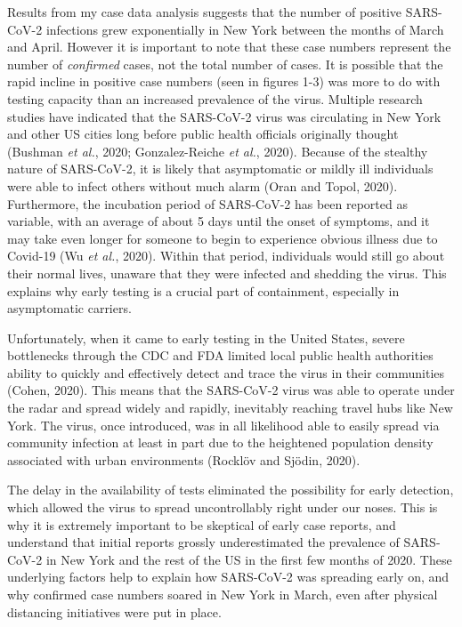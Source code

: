 \documentclass[
]{article}
\begin{document}
Results from my case data analysis suggests that the number of positive
SARS-CoV-2 infections grew exponentially in New York between the months
of March and April. However it is important to note that these case
numbers represent the number of \emph{confirmed} cases, not the total
number of cases. It is possible that the rapid incline in positive case
numbers (seen in figures 1-3) was more to do with testing capacity than
an increased prevalence of the virus. Multiple research studies have
indicated that the SARS-CoV-2 virus was circulating in New York and
other US cities long before public health officials originally thought
(Bushman \emph{et al.}, 2020; Gonzalez-Reiche \emph{et al.}, 2020).
Because of the stealthy nature of SARS-CoV-2, it is likely that
asymptomatic or mildly ill individuals were able to infect others
without much alarm (Oran and Topol, 2020). Furthermore, the incubation
period of SARS-CoV-2 has been reported as variable, with an average of
about 5 days until the onset of symptoms, and it may take even longer
for someone to begin to experience obvious illness due to Covid-19 (Wu
\emph{et al.}, 2020). Within that period, individuals would still go
about their normal lives, unaware that they were infected and shedding
the virus. This explains why early testing is a crucial part of
containment, especially in asymptomatic carriers.

Unfortunately, when it came to early testing in the United States,
severe bottlenecks through the CDC and FDA limited local public health
authorities ability to quickly and effectively detect and trace the
virus in their communities (Cohen, 2020). This means that the SARS-CoV-2
virus was able to operate under the radar and spread widely and rapidly,
inevitably reaching travel hubs like New York. The virus, once
introduced, was in all likelihood able to easily spread via community
infection at least in part due to the heightened population density
associated with urban environments (Rocklöv and Sjödin, 2020).

The delay in the availability of tests eliminated the possibility for
early detection, which allowed the virus to spread uncontrollably right
under our noses. This is why it is extremely important to be skeptical
of early case reports, and understand that initial reports grossly
underestimated the prevalence of SARS-CoV-2 in New York and the rest of
the US in the first few months of 2020. These underlying factors help to
explain how SARS-CoV-2 was spreading early on, and why confirmed case
numbers soared in New York in March, even after physical distancing
initiatives were put in place.
\end{document}
